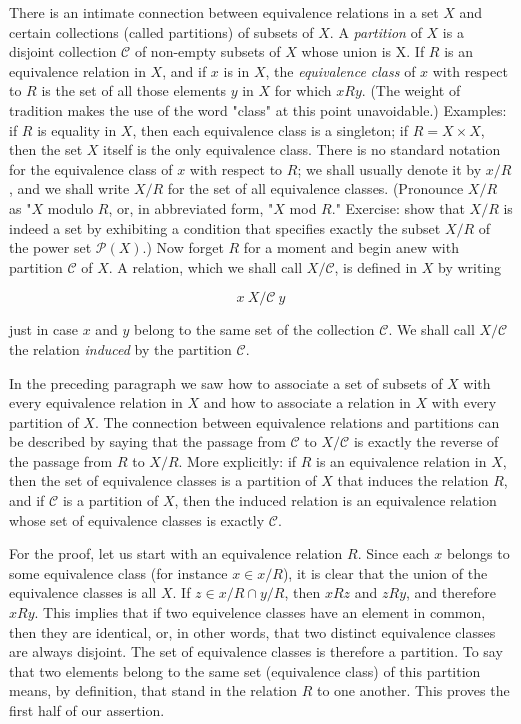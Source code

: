 There is an intimate connection between equivalence relations in a set $X$ and certain collections (called partitions) of subsets of $X$. A \textit{partition} of $X$ is a disjoint collection $ \mathcal{C} $ of non-empty subsets of $X$ whose union is X. If $R$ is an equivalence relation in $X$, and if $x$ is in $X$, the \textit{equivalence class} of $x$ with respect to $R$ is the set of all those elements $y$ in $X$ for which $x R y$. (The weight of tradition makes the use of the word "class" at this point unavoidable.) Examples: if $ R$ is equality in $X$, then each equivalence class is a singleton; if $R =  X \times X$, then the set $X$ itself is the only equivalence class. There is no standard notation for the equivalence class of $x$ with respect to $R$; we shall usually denote it by $x/ R$, and we shall write $X/ R$ for the set of all equivalence classes. (Pronounce $X/ R$ as "$X$ modulo $R$, or, in abbreviated form, "$X$ mod $R$." Exercise: show that $X/ R$ is indeed a set by exhibiting a condition that specifies exactly the subset $X/ R$ of the power set $\mathcal{P}(X)$.) Now forget $R$ for a moment and begin anew with partition $\mathcal{C}$ of $X$. A relation, which we shall call $X/ \mathcal{C}$, is defined in $X$ by writing

\begin{equation*}
x \: X/ \mathcal{C} \: y
\end{equation*}

just in case $x$ and $y$ belong to the same set of the collection $\mathcal{C}$. We shall call $X/ \mathcal{C}$ the relation \textit{induced} by the partition $\mathcal{C}$.

In the preceding paragraph we saw how to associate a set of subsets of $X$ with every equivalence relation in $X$ and how to associate a relation in $X$ with every partition of $X$. The connection between equivalence relations and partitions can be described by saying that the passage from $\mathcal{C}$ to $X/ \mathcal{C}$ is exactly the reverse of the passage from $R$ to $X/ R$. More explicitly: if $R$ is an equivalence relation in $X$, then the set of equivalence classes is a partition of $X$ that induces the relation $R$, and if $\mathcal{C}$ is a partition of $X$, then the induced relation is an equivalence relation whose set of equivalence classes is exactly $\mathcal{C}$. 

For the proof, let us start with an equivalence relation $R$. Since each $x$ belongs to some equivalence class (for instance $x \in x/ R$), it is clear that the union of the equivalence classes is all $X$. If $z \in x/ R \cap y/ R$, then $x R z$ and $z R y$, and therefore $x R y$. This implies that if two equivelence classes have an element in common, then they are identical, or, in other words, that two distinct  equivalence classes are always disjoint. The set of equivalence classes is therefore a partition. To say that two elements belong to the same set (equivalence class) of this partition means, by definition, that stand in the relation $R$ to one another. This proves the first half of our assertion. 

